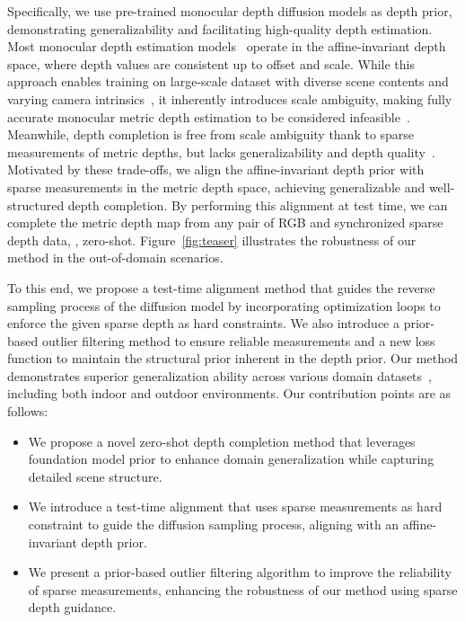 Specifically, we use pre-trained monocular depth diffusion models \cite{ke2023repurposing, gui2024depthfm} as depth prior, 
demonstrating generalizability and facilitating high-quality depth estimation.
Most monocular depth estimation models~\cite{Ranftl2022midas, ke2023repurposing, depthanything, gui2024depthfm} operate in the affine-invariant depth space, where depth values are consistent up to offset and scale.
While this approach enables training on large-scale dataset with diverse scene contents and varying camera intrinsics~\cite{ke2023repurposing}, it inherently introduces scale ambiguity, making fully accurate monocular metric depth estimation to be considered infeasible~\cite{yin2023metric}.
Meanwhile, depth completion is free from scale ambiguity thank to sparse measurements of metric depths, but lacks generalizability and depth quality~\cite{park2024testtime}.
Motivated by these trade-offs, we align the affine-invariant depth prior with sparse measurements in the metric depth space, achieving generalizable and well-structured depth completion.
By performing this alignment at test time, we can complete the metric depth map from any pair of RGB and synchronized sparse depth data, \ie, zero-shot.
Figure~\ref{fig:teaser} illustrates the robustness of our method in the out-of-domain scenarios.

To this end, we propose a test-time alignment method that guides the reverse sampling process of the diffusion model
by incorporating optimization loops to enforce the given sparse depth as hard constraints. 
We also introduce a prior-based outlier filtering method to ensure reliable measurements and a new loss function to maintain the structural prior inherent in the depth prior.
Our method demonstrates superior generalization ability across various domain datasets~\cite{silberman2012nyu, mccormac2017scenenet, sun2020waymo, caesar2020nuscene}, including both indoor and outdoor environments.
Our contribution points are as follows:

\begin{itemize}
    \setlength\itemsep{0.3em}
    \item 
    We propose a novel zero-shot depth completion method that leverages foundation model prior to enhance domain generalization while capturing detailed scene structure.
    
    \item 
    We introduce a test-time alignment that uses sparse measurements as hard constraint to guide the diffusion sampling process, aligning with an affine-invariant depth prior.

    \item 
    We present a prior-based outlier filtering algorithm to improve the reliability of sparse measurements,
    enhancing the robustness of our method using 
    sparse depth guidance.    
\end{itemize}